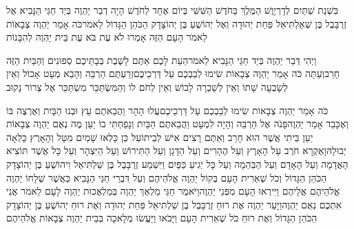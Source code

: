 \documentclass[../main/main.tex]{subfiles}
\begin{document}
\pagebreak
{}
\begin{multicols*}{\ncols}
בִּשְׁנַת שְׁתַּיִם לְדָרְיָוֶשׁ הַמֶּלֶךְ בַּחֹדֶשׁ הַשִּׁשִּׁי בְּיוֹם אֶחָד לַחֹדֶשׁ הָיָה דְבַר יַהְוֶה בְּיַד חַגַּי הַנָּבִיא אֶל זְרֻבָּבֶל בֶּן שְׁאַלְתִּיאֵל פַּחַת יְהוּדָה וְאֶל יְהוֹשֻׁעַ בֶּן יְהוֹצָדָק הַכֹּהֵן הַגָּדוֹל לֵאמֹר\PreVerseSpace{}כֹּה אָמַר יַהְוֶה צְבָאוֹת לֵאמֹר הָעָם הַזֶּה אָמְרוּ לֹא עֶת בֹּא עֶת בֵּית יַהְוֶה לְהִבָּנוֹת\OpenSection{}\par
{}וַיְהִי דְּבַר יַהְוֶה בְּיַד חַגַּי הַנָּבִיא לֵאמֹר\PreVerseSpace{}הַעֵת לָכֶם אַתֶּם לָשֶׁבֶת בְּבָתֵּיכֶם סְפוּנִים וְהַבַּיִת הַזֶּה חָרֵב\PreVerseSpace{}וְעַתָּה כֹּה אָמַר יַהְוֶה צְבָאוֹת שִׂימוּ לְבַבְכֶם עַל דַּרְכֵיכֶם\PreVerseSpace{}זְרַעְתֶּם הַרְבֵּה וְהָבֵא מְעָט אָכוֹל וְאֵין לְשָׂבְעָה שָׁתוֹ וְאֵין לְשָׁכְרָה לָבוֹשׁ וְאֵין לְחֹם לוֹ וְהַמִּשְׂתַּכֵּר מִשְׂתַּכֵּר אֶל צְרוֹר נָקוּב\OpenSection{}\par
{}כֹּה אָמַר יַהְוֶה צְבָאוֹת שִׂימוּ לְבַבְכֶם עַל דַּרְכֵיכֶם\PreVerseSpace{}עֲלוּ הָהָר וַהֲבֵאתֶם עֵץ וּבְנוּ הַבָּיִת וְאֶרְצֶה בּוֹ וְאֶכָּבֵד אָמַר יַהְוֶה\PreVerseSpace{}פָּנֹה אֶל הַרְבֵּה וְהָיָה\SubEnd{} לִמְעָט וַהֲבֵאתֶם הַבַּיִת וְנָפַחְתִּי בוֹ יַעַן מֶה נְאֻם יַהְוֶה צְבָאוֹת יַעַן בֵּיתִי אֲשֶׁר הוּא חָרֵב וְאַתֶּם רָצִים אִישׁ לְבֵיתוֹ\PreVerseSpace{}עַל כֵּן  כָּלְאוּ שָׁמַיִם מִטָּל וְהָאָרֶץ כָּלְאָה יְבוּלָהּ\PreVerseSpace{}וָאֶקְרָא חֹרֶב עַל הָאָרֶץ וְעַל הֶהָרִים וְעַל הַדָּגָן וְעַל הַתִּירוֹשׁ וְעַל הַיִּצְהָר וְעַל כָּל\OmitEnd{} אֲשֶׁר תּוֹצִיא הָאֲדָמָה וְעַל הָאָדָם וְעַל הַבְּהֵמָה וְעַל כָּל יְגִיעַ כַּפָּיִם \ClosedSection{}וַיִּשְׁמַע זְרֻבָּבֶל בֶּן שַׁלְתִּיאֵל וִיהוֹשֻׁעַ בֶּן יְהוֹצָדָק הַכֹּהֵן הַגָּדוֹל וְכֹל שְׁאֵרִית הָעָם בְּקוֹל יַהְוֶה אֱלֹהֵיהֶם וְעַל דִּבְרֵי חַגַּי הַנָּבִיא כַּאֲשֶׁר שְׁלָחוֹ יַהְוֶה אֱלֹהֵיהֶם אֲלֵיהֶם\OmitEnd{} וַיִּירְאוּ הָעָם מִפְּנֵי יַהְוֶה\PreVerseSpace{}וַיֹּאמֶר חַגַּי מַלְאַךְ יַהְוֶה בְּמַלְאֲכוּת יַהְוֶה לָעָם לֵאמֹר אֲנִי אִתְּכֶם נְאֻם יַהְוֶה\PreVerseSpace{}וַיָּעַר יַהְוֶה אֶת רוּחַ זְרֻבָּבֶל בֶּן שַׁלְתִּיאֵל פַּחַת יְהוּדָה וְאֶת רוּחַ יְהוֹשֻׁעַ בֶּן יְהוֹצָדָק הַכֹּהֵן הַגָּדוֹל וְאֶת רוּחַ כֹּל שְׁאֵרִית הָעָם וַיָּבֹאוּ וַיַּעֲשׂוּ מְלָאכָה בְּבֵית יַהְוֶה צְבָאוֹת אֱלֹהֵיהֶם\OpenSection{}\par

\end{multicols*}
\end{document}
